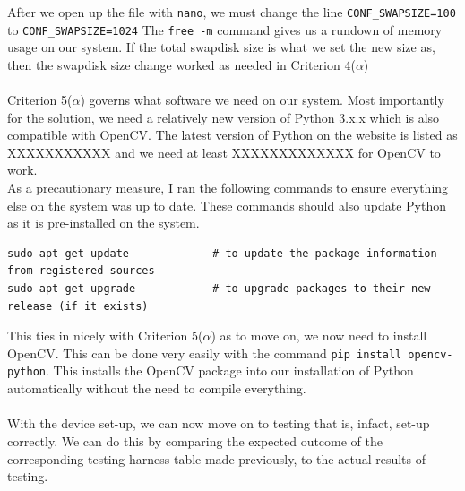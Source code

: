 \documentclass[9pt]{article}
\begin{document}
After we open up the file with \texttt{nano}, we must change the line \texttt{CONF\_SWAPSIZE=100} to \texttt{CONF\_SWAPSIZE=1024}
The \texttt{free -m} command gives us a rundown of memory usage on our system. If the total swapdisk size is what we set the new size as, then the swapdisk size change worked as needed in Criterion 4($ \alpha $)\\\\
Criterion 5($ \alpha $) governs what software we need on our system. Most importantly for the solution, we need a relatively new version of Python 3.x.x which is also compatible with OpenCV. The latest version of Python on the website is listed as XXXXXXXXXXX and we need at least XXXXXXXXXXXXX for OpenCV to work. \\
As a precautionary measure, I ran the following commands to ensure everything else on the system was up to date. These commands should also update Python as it is pre-installed on the system.
\begin{lstlisting}
sudo apt-get update				# to update the package information from registered sources
sudo apt-get upgrade			# to upgrade packages to their new release (if it exists)
\end{lstlisting}
This ties in nicely with Criterion 5($ \alpha $) as to move on, we now need to install OpenCV. This can be done very easily  with the command \texttt{pip install opencv-python}. This installs the OpenCV package into our installation of Python automatically without the need to compile everything.\\\\
With the device set-up, we can now move on to testing that is, infact, set-up correctly. We can do this by comparing the expected outcome of the corresponding testing harness table made previously, to the actual results of testing.
\end{document}
